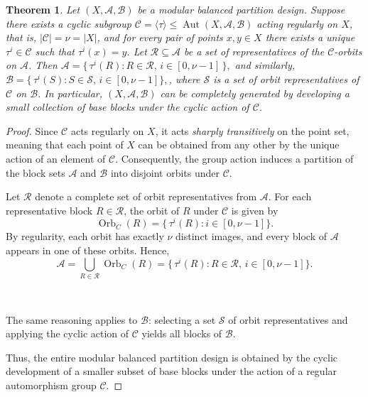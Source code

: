 \documentclass[preprint,11pt]{elsarticle}
\newtheorem{theorem}{Theorem}[section]
\begin{document}
\begin{theorem}
\label{thm:development}
Let $(X, \mathcal{A}, \mathcal{B})$ be a modular balanced partition design. 
Suppose there exists a cyclic subgroup 
$\mathcal{C}=\langle \tau \rangle \leq \operatorname{Aut}(X, \mathcal{A}, \mathcal{B})$
acting {regularly} on $X$, that is, $|\mathcal{C}|=\nu=|X|$, and for every pair of points 
$x, y \in X$ there exists a unique $\tau^i \in \mathcal{C}$ such that $\tau^i(x)=y$. 
Let $\mathcal{R} \subseteq \mathcal{A}$ be a set of representatives of the $\mathcal{C}$-orbits on $\mathcal{A}$. 
Then $
\mathcal{A} = \big\{\, \tau^i(R) : R \in \mathcal{R},\, i \in [0,  \nu-1] \,\big\},
$
and similarly,
$
\mathcal{B} = \big\{\, \tau^i(S) : S \in \mathcal{S},\,i \in [0,  \nu-1] \big\},
$, 
where $\mathcal{S}$ is a set of orbit representatives of $\mathcal{C}$ on $\mathcal{B}$. 
In particular, $(X, \mathcal{A}, \mathcal{B})$ can be completely generated by 
developing a small collection of base blocks under the cyclic action of $\mathcal{C}$.
\end{theorem}

\begin{proof}
Since $\mathcal{C}$ acts regularly on $X$, it acts \emph{sharply transitively} on the point set, 
meaning that each point of $X$ can be obtained from any other by the unique action 
of an element of $\mathcal{C}$. Consequently, the group action induces a partition of the block sets 
$\mathcal{A}$ and $\mathcal{B}$ into disjoint orbits under $\mathcal{C}$.

Let $\mathcal{R}$ denote a complete set of orbit representatives from $\mathcal{A}$.
For each representative block $R \in \mathcal{R}$, the orbit of $R$ under $\mathcal{C}$ is given by 
\[
\operatorname{Orb}_C(R) = \{\, \tau^i(R) : i \in [0,  \nu-1] \}.
\]
By regularity, each orbit has exactly $\nu$ distinct images, and every block of $\mathcal{A}$ 
appears in one of these orbits. Hence,
\[
\mathcal{A} = \bigcup_{R \in \mathcal{R}} \operatorname{Orb}_C(R)
= \big\{\, \tau^i(R) : R \in \mathcal{R},\, i \in [0,  \nu-1] \big\}.
\]

\



The same reasoning applies to $\mathcal{B}$: selecting a set $\mathcal{S}$ of orbit representatives 
and applying the cyclic action of $\mathcal{C}$ yields all blocks of $\mathcal{B}$. 

Thus, the entire modular balanced partition design is obtained by the cyclic development of 
a smaller subset of base blocks under the action of a regular automorphism group $\mathcal{C}$.
\end{proof}
\end{document}
